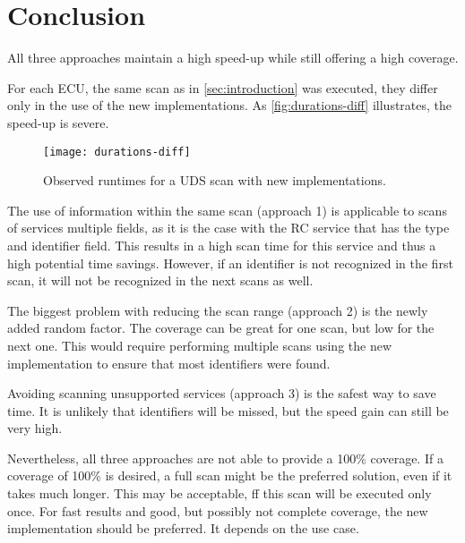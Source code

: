\section{Conclusion}

All three approaches maintain a high speed-up while still offering a high coverage.

For each ECU, the same scan as in \autoref{sec:introduction} was executed, they differ only in the use of the new implementations. As \autoref{fig:durations-diff} illustrates, the speed-up is severe.

\begin{figure}[h]
    \centering
    \texttt{[image: durations-diff]}
    \caption{Observed runtimes for a UDS scan with new implementations.}
    \label{fig:durations-diff}
\end{figure}

The use of information within the same scan (approach 1) is applicable to scans of services multiple fields, as it is the case with the RC service that has the type and identifier field. This results in a high scan time for this service and thus a high potential time savings. However, if an identifier is not recognized in the first scan, it will not be recognized in the next scans as well.

The biggest problem with reducing the scan range (approach 2) is the newly added random factor. The coverage can be great for one scan, but low for the next one. This would require performing multiple scans using the new implementation to ensure that most identifiers were found.

Avoiding scanning unsupported services (approach 3) is the safest way to save time. It is unlikely that identifiers will be missed, but the speed gain can still be very high.

Nevertheless, all three approaches are not able to provide a 100\% coverage. 
If a coverage of 100\% is desired, a full scan might be the preferred solution, even if it takes much longer. This may be acceptable, ff this scan will be executed only once. For fast results and good, but possibly not complete coverage, the new implementation should be preferred. It depends on the use case.

